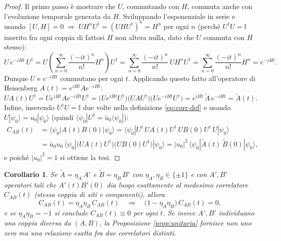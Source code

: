 \documentclass[11pt,a4paper]{article}
\newtheorem{corollario}{Corollario}
\begin{document}
\begin{proof}
Il primo passo è mostrare che $U$, commutando con $H$, commuta anche con l'evoluzione
temporale generata da $H$. Sviluppando l'esponenziale in serie e usando $[U,H]=0
\;\Rightarrow\; UH^nU^\dagger=(UHU^\dagger)^n=H^n$ per ogni $n$ (perché $U^\dagger U=\mathbb I$
inserito fra ogni coppia di fattori $H$ non altera nulla, dato che $U$ commuta con $H$ stesso):
\begin{equation}
U\,e^{-iHt}\,U^\dagger = U\left(\sum_{n=0}^\infty \frac{(-it)^n}{n!}H^n\right)U^\dagger
= \sum_{n=0}^\infty \frac{(-it)^n}{n!}\,UH^nU^\dagger
= \sum_{n=0}^\infty \frac{(-it)^n}{n!}H^n = e^{-iHt}.
\label{eq:U-evol}
\end{equation}
Dunque $U$ e $e^{-iHt}$ commutano per ogni $t$. Applicando questo fatto all'operatore di
Heisenberg $A(t)=e^{iHt}Ae^{-iHt}$:
\begin{equation}
U A(t) U^\dagger = U e^{iHt}Ae^{-iHt}U^\dagger
= \big(Ue^{iHt}U^\dagger\big)\big(UAU^\dagger\big)\big(Ue^{-iHt}U^\dagger\big)
= e^{iHt}\,\widetilde A\,e^{-iHt} = \widetilde A(t).
\label{eq:UAtU}
\end{equation}
Infine, inserendo $U^\dagger U=\mathbb I$ due volte nella definizione \eqref{eq:corr-def} e usando
$U|\psi_0\rangle=u_0|\psi_0\rangle$ (quindi $\langle\psi_0|U^\dagger = \bar u_0\langle\psi_0|$):
\begin{align}
C_{AB}(t) &= \langle\psi_0|A(t)B(0)|\psi_0\rangle
= \langle\psi_0|U^\dagger\, U A(t)U^\dagger\, U B(0)U^\dagger\, U|\psi_0\rangle \\
&= \bar u_0 u_0\,\langle\psi_0|\big(UA(t)U^\dagger\big)\big(UB(0)U^\dagger\big)|\psi_0\rangle
= |u_0|^2\,\langle\psi_0|\widetilde A(t)\,\widetilde B(0)|\psi_0\rangle,
\end{align}
e poiché $|u_0|^2=1$ si ottiene la tesi.
\end{proof}

\begin{corollario}
\label{cor:zero-unitario}
Se $\widetilde A = \eta_A\,A'$ e $\widetilde B=\eta_B\,B'$ con $\eta_A,\eta_B\in\{\pm1\}$ e con
$A',B'$ operatori tali che $A'(t)B'(0)$ dia luogo esattamente al \emph{medesimo} correlatore
$C_{AB}(t)$ (stessa coppia di siti e componenti), allora
\begin{equation}
C_{AB}(t) = \eta_A\eta_B\, C_{AB}(t) \quad\Longrightarrow\quad
\big(1-\eta_A\eta_B\big)\,C_{AB}(t)=0,
\end{equation}
e se $\eta_A\eta_B=-1$ si conclude $C_{AB}(t)\equiv 0$ per ogni $t$.
Se invece $A',B'$ individuano una coppia \emph{diversa} da $(A,B)$, la Proposizione
\ref{prop:unitaria} fornisce non uno zero ma una relazione esatta fra due correlatori distinti.
\end{corollario}
\end{document}

